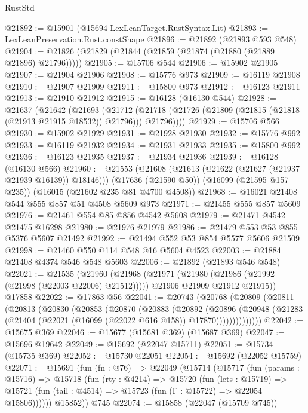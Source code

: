 \begin{lexlean}{RustStd}
\begin{coremodule}
@21892 := @15901 (@15694 LexLeanTarget.RustSyntax.Lit)
@21893 := LexLeanPreservation.Rust.constShape
@21896 := @21892 (@21893 @593 @548)
@21904 := @21826 (@21829 (@21844 (@21859 (@21874 (@21880 (@21889 @21896) @21796)))))
@21905 := @15706 @544
@21906 := @15902 @21905
@21907 := @21904 @21906
@21908 := @15776 @973
@21909 := @16119 @21908
@21910 := @21907 @21909
@21911 := @15800 @973
@21912 := @16123 @21911
@21913 := @21910 @21912
@21915 := @16128 (@16130 @544)
@21928 := @21637
    (@21642
      (@21693
        (@21712 (@21718 (@21726 (@21809 (@21815 (@21818 (@21913 @21915 @18532)) @21796))) @21796))))
@21929 := @15706 @566
@21930 := @15902 @21929
@21931 := @21928 @21930
@21932 := @15776 @992
@21933 := @16119 @21932
@21934 := @21931 @21933
@21935 := @15800 @992
@21936 := @16123 @21935
@21937 := @21934 @21936
@21939 := @16128 (@16130 @566)
@21960 := @21553
    (@21608 (@21613 (@21622 (@21627 (@21937 @21939 @16139)) @18146)))
    (@17636 (@21590 @50))
    (@16099 (@21595 @157 @235))
    (@16015 (@21602 @235 @81 @4700 @4508))
@21968 := @16021 @21408 @544 @555 @857 @51 @4508 @5609 @973
@21971 := @21455 @555 @857 @5609
@21976 := @21461 @554 @85 @856 @4542 @5608
@21979 := @21471 @4542 @21475 @16298
@21980 := @21976 @21979
@21986 := @21479 @553 @53 @855 @5376 @5607 @21492
@21992 := @21494 @552 @53 @854 @5577 @5606 @21509
@21998 := @21460 @550 @114 @548 @16 @5604 @4523
@22003 := @21884 @21408 @4374 @546 @548 @5603
@22006 := @21892 (@21893 @546 @548)
@22021 := @21535
    (@21960
      (@21968
        (@21971 (@21980 (@21986 (@21992 (@21998 (@22003 @22006) @21512)))))
        @21906
        @21909
        @21912
        @21915))
    @17858
@22022 := @17863 @56
@22041 := @20743
    (@20768
      (@20809
        (@20811
          (@20813
            (@20830
              (@20853
                (@20870
                  (@20883
                    (@20892
                      (@20896
                        (@20948
                          (@21283 (@21404 (@22021 (@16099 (@22022 @616 @158)) @17870))))))))))))))
@22042 := @15675 @369
@22046 := @15677 (@15681 @369) (@15687 @369)
@22047 := @15696 @19642
@22049 := @15692 (@22047 @15711)
@22051 := @15734 (@15735 @369)
@22052 := @15730 @22051
@22054 := @15692 (@22052 @15759)
@22071 := @15691
    (fun (fn : @76) =>
    @22049
      (@15714
        (@15717
          (fun (params : @15716) =>
          @15718
            (fun (rty : @4214) =>
            @15720
              (fun (lets : @15719) =>
              @15721 (fun (tail : @4514) => @15723 (fun (Γ : @15722) => @22054 @15806))))))
        @15852))
    @745
@22074 := @15858 (@22047 (@15709 @745))

\end{coremodule}
\end{lexlean}
